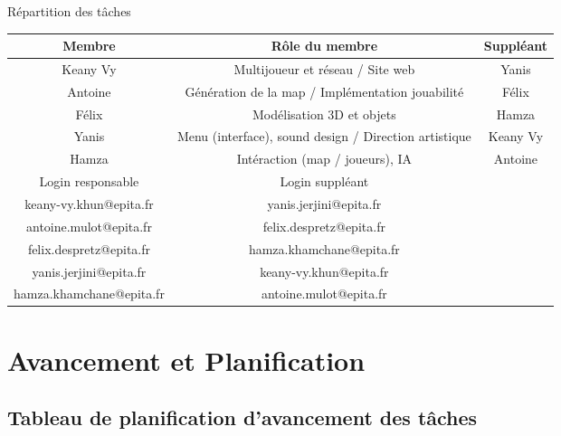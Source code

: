 \documentclass[
	article,			%
	11pt,				%
	oneside,			%
	a4paper,			%
	chapter=TITLE,
	french,			%
	sumario=tradicional
	]{base_nt}
\begin{document}
\begin{quadro}
	\caption{Répartition des tâches}
	\centering
	\begin{tabular}{|c|c|c|}
		\hline
		Membre   & Rôle du membre & Suppléant  \\
		\hline
		Keany Vy & Multijoueur et réseau / Site web & Yanis \\
		Antoine & Génération de la map / Implémentation jouabilité & Félix \\
		Félix & Modélisation 3D et objets & Hamza \\
            Yanis & Menu (interface), sound design / Direction artistique  & Keany Vy \\
            Hamza & Intéraction (map / joueurs), IA  & Antoine \\
		\hline
		Login responsable &  Login suppléant  & \\
            \hline
            keany-vy.khun@epita.fr & yanis.jerjini@epita.fr & \\
            antoine.mulot@epita.fr & felix.despretz@epita.fr & \\
            felix.despretz@epita.fr & hamza.khamchane@epita.fr & \\
            yanis.jerjini@epita.fr & keany-vy.khun@epita.fr & \\
            hamza.khamchane@epita.fr & antoine.mulot@epita.fr & \\
            \hline
	\end{tabular}
\end{quadro}

\section{Avancement et Planification}

\subsection{Tableau de planification d'avancement des tâches}
\end{document}

